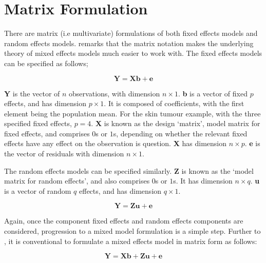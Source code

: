 \documentclass[12pt, a4paper]{report}
\theoremstyle{plain}
\theoremstyle{definition}
\theoremstyle{remark}
\begin{document}
	
	
	
	
	
	








\section{Matrix Formulation} There are matrix (i.e multivariate)
formulations of both fixed effects models and random effects
models. \citet{BrownPrescott} remarks that the matrix notation
makes the underlying theory of mixed effects models much easier to
work with. The fixed effects models can be specified as follows;

\begin{equation}
\textbf{Y} = \textbf{Xb} + \textbf{e}
\end{equation}

\textbf{Y} is the vector of $n$ observations, with dimension $n
\times 1$. \textbf{b} is a vector of fixed $p$ effects, and has
dimension $p \times 1$. It is composed of coefficients, with the
first element being the population mean. For the skin tumour
example, with the three specified fixed effects, $p=4$. \textbf{X}
is known as the design `matrix', model matrix for fixed effects,
and comprises $0$s or $1$s, depending on whether the relevant
fixed effects have any effect on the observation is question.
\textbf{X} has dimension $n \times p$. \textbf{e} is the vector of
residuals with dimension $n \times 1$.

The random effects models can be specified similarly. \textbf{Z}
is known as the `model matrix for random effects', and also
comprises $0$s or $1$s. It has dimension $n \times q$. \textbf{u}
is a vector of random $q$ effects, and has dimension $q \times 1$.

\begin{equation}
\textbf{Y} = \textbf{Zu} + \textbf{e}
\end{equation}

Again, once the component fixed effects and random effects
components are considered, progression to a mixed model
formulation is a simple step. Further to \citet{LW82}, it is
conventional to formulate a mixed effects model in matrix form as
follows:

\begin{equation}
\textbf{Y} = \textbf{Xb} + \textbf{Zu} + \textbf{e}
\end{equation}
\end{document}
